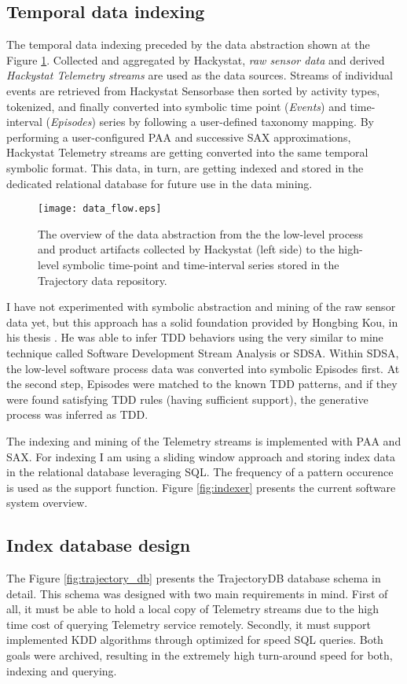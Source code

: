 \subsection{Temporal data indexing}
The temporal data indexing preceded by the data abstraction shown at the Figure \ref{fig:data_flow}. Collected and aggregated by Hackystat, \textit{raw sensor data} and derived \textit{Hackystat Telemetry streams} are used as the data sources. Streams of individual events are retrieved from Hackystat Sensorbase then sorted by activity types, tokenized, and finally converted into symbolic time point (\textit{Events}) and time-interval (\textit{Episodes}) series by following a user-defined taxonomy mapping. By performing a user-configured PAA and successive SAX approximations, Hackystat Telemetry streams are getting converted into the same temporal symbolic format. This data, in turn, are getting indexed and stored in the dedicated relational database for future use in the data mining.

\begin{figure}[tbp]
   \centering
   \texttt{[image: data\_flow.eps]}
   \caption{The overview of the data abstraction from the the low-level process and product artifacts collected by Hackystat (left side) to the high-level symbolic time-point and time-interval series stored in the Trajectory data repository.}
   \label{fig:data_flow}
\end{figure}

I have not experimented with symbolic abstraction and mining of the raw sensor data yet, but this approach has a solid foundation provided by Hongbing Kou, in his thesis \cite{citeulike:2703162}. He was able to infer TDD behaviors using the very similar to mine technique called Software Development Stream Analysis or SDSA. Within SDSA, the low-level software process data was converted into symbolic Episodes first. At the second step, Episodes were matched to the known TDD patterns, and if they were found satisfying TDD rules (having sufficient support), the generative process was inferred as TDD.

The indexing and mining of the Telemetry streams is implemented with PAA and SAX. For indexing I am using a sliding window approach and storing index data in the relational database leveraging SQL. The frequency of a pattern occurence is used as the support function. Figure \ref{fig:indexer} presents the current software system overview.

\subsection{Index database design}
The Figure \ref{fig:trajectory_db} presents the TrajectoryDB database schema in detail. This schema was designed with two main requirements in mind. First of all, it must be able to hold a local copy of Telemetry streams due to the high time cost of querying Telemetry service remotely. Secondly, it must support implemented KDD algorithms through optimized for speed SQL queries. Both goals were archived, resulting in the extremely high turn-around speed for both, indexing and querying.

